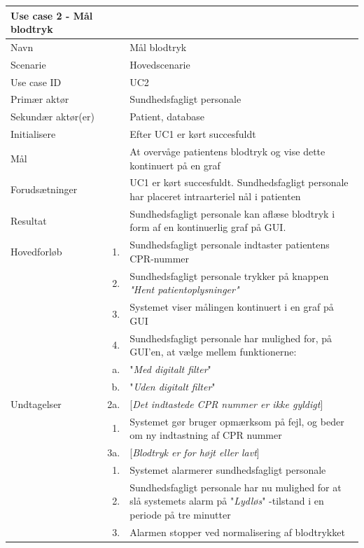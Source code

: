 \begin{longtabu} to 
\toprule
    {\large \textbf{Use case 2 - Mål blodtryk}} && \\
    \toprule
    Navn &&    Mål blodtryk\\
    Scenarie &&    Hovedscenarie\\
    Use case ID &&    UC2\\
    Primær aktør &&    Sundhedsfagligt personale\\
    Sekundær aktør(er) &&    Patient, database\\
    Initialisere &&    Efter UC1 er kørt succesfuldt\\
    Mål &&    At overvåge patientens blodtryk og vise dette kontinuert på en graf\\
    Forudsætninger &&    UC1 er kørt succesfuldt. Sundhedsfagligt personale har placeret intraarteriel nål i patienten\\
    Resultat &&    Sundhedsfagligt personale kan aflæse blodtryk i form af en kontinuerlig graf på GUI.\\
    \toprule
    Hovedforløb &    1. &    Sundhedsfagligt personale indtaster patientens CPR-nummer\\[-1ex]
    			&    2. &    Sundhedsfagligt personale trykker på knappen \textit{"Hent patientoplysninger"}\\[-1ex]
                &    3. &    Systemet viser målingen kontinuert i en graf på GUI\\
                &    4. &    Sundhedsfagligt personale har mulighed for, på GUI'en, at vælge mellem funktionerne:\\[-1ex]
                &	a. &	"\textit{Med digitalt filter}"\\[-1ex]
                &	b.	&	"\textit{Uden digitalt filter}"\\[-1ex]
    \toprule
    Undtagelser &    2a. &    [\textit{Det indtastede CPR nummer er ikke gyldigt}]\\[-1ex]
    &	1. &	Systemet gør bruger opmærksom på fejl, og beder om ny indtastning af CPR nummer\\[-1ex]
    &	3a.	&	[\textit{Blodtryk er for højt eller lavt}]\\[-1ex]
    &	1.	&	Systemet alarmerer sundhedsfagligt personale\\[-1ex]
    &	2.	&	Sundhedsfagligt personale har nu mulighed for at slå systemets alarm på "\textit{Lydløs}"\- -tilstand i en periode på tre minutter\\[-1ex]
    &	3.	&	Alarmen stopper ved normalisering af blodtrykket\\
                \toprule
       

\end{longtabu}
